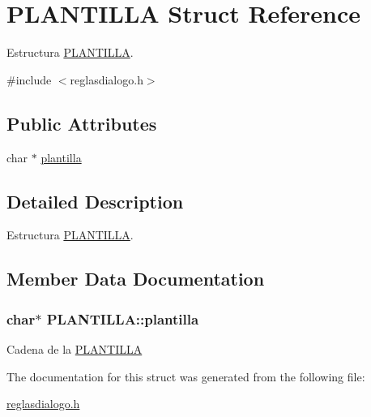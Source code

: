 \hypertarget{structPLANTILLA}{
\section{PLANTILLA Struct Reference}
\label{structPLANTILLA}
}


Estructura \hyperlink{structPLANTILLA}{PLANTILLA}.  




{\ttfamily \#include $<$reglasdialogo.h$>$}

\subsection*{Public Attributes}
\begin{DoxyCompactItemize}
\item 
char $\ast$ \hyperlink{structPLANTILLA_aa5df9fdffad6ad7d3edc237b3907eb36}{plantilla}
\end{DoxyCompactItemize}


\subsection{Detailed Description}
Estructura \hyperlink{structPLANTILLA}{PLANTILLA}. 

\subsection{Member Data Documentation}
\hypertarget{structPLANTILLA_aa5df9fdffad6ad7d3edc237b3907eb36}{
\subsubsection[{plantilla}]{\setlength{\rightskip}{0pt plus 5cm}char$\ast$ {\bf PLANTILLA::plantilla}}}
\label{structPLANTILLA_aa5df9fdffad6ad7d3edc237b3907eb36}
Cadena de la \hyperlink{structPLANTILLA}{PLANTILLA} 

The documentation for this struct was generated from the following file:\begin{DoxyCompactItemize}
\item 
\hyperlink{reglasdialogo_8h}{reglasdialogo.h}\end{DoxyCompactItemize}
